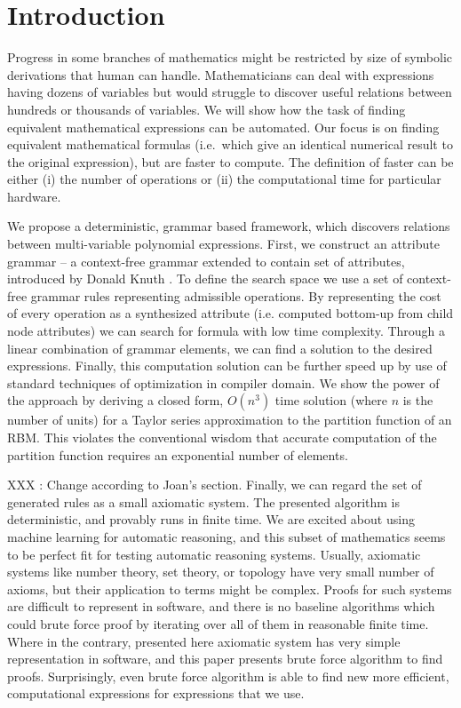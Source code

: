 \section{Introduction} \label{introduction} 

Progress in some branches of
mathematics might be restricted by size of symbolic derivations that human can
handle. Mathematicians can deal with expressions having dozens of
variables but would struggle to discover useful relations between hundreds or
thousands of variables. We will show how the task of finding equivalent
mathematical expressions can be automated. Our focus is on finding equivalent
mathematical formulas (i.e.~which give an identical numerical result
to the original expression),
but are faster to compute. The definition
of faster can be either (i) the number of operations or (ii) the computational time
for particular hardware.

We propose a deterministic, grammar based framework, which discovers
relations between multi-variable polynomial expressions. First, we
construct an attribute grammar -- a context-free grammar extended to
contain set of attributes, introduced by Donald Knuth
\cite{knuth1968semantics}. To define the search space we use a set of
context-free grammar rules representing admissible operations. By
representing the cost of every operation as a synthesized attribute
(i.e. computed bottom-up from child node attributes) we can search for
formula with low time complexity. Through a linear combination of
grammar elements, we can find a solution to the desired
expressions. Finally, this computation solution can be further speed
up by use of standard techniques of optimization in compiler
domain. We show the power of the approach by deriving a closed form,
$O(n^3)$ time solution (where $n$ is the number of units) for a Taylor
series approximation to the partition function of an RBM. This
violates the conventional wisdom that accurate computation of the
partition function requires an exponential number of elements.


XXX : Change according to Joan's section.
Finally, we can regard the set of generated rules as a small axiomatic system.
The presented algorithm is deterministic, and provably runs in finite
time. We are excited about using machine learning for automatic reasoning, and
this subset of mathematics seems to be perfect fit for testing automatic reasoning systems.
Usually, axiomatic systems like number theory, set theory, or topology have very small
number of axioms, but their application to terms might be complex. Proofs
for such systems are difficult to represent in software, and there is no
baseline algorithms which could brute force proof by iterating over all of them in reasonable finite time.
Where in the contrary, presented here axiomatic system has very simple representation
in software, and this paper presents brute force algorithm to find proofs. 
Surprisingly, even brute force algorithm is able to find new more efficient,
computational expressions for expressions that we use.




